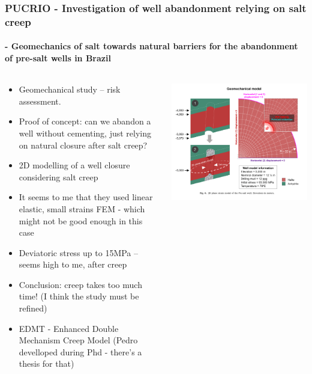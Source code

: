 \begin{frame}[shrink=20, fragile]
\frametitle{PUCRIO - Investigation of well abandonment relying on salt creep}
\framesubtitle{\cite{firme23} - Geomechanics of salt towards natural barriers for the abandonment of pre-salt wells in Brazil}

\begin{columns}
\begin{column}{0.5\textwidth}
	\begin{itemize}
		\item Geomechanical study -- risk assessment.
		\item Proof of concept: can we abandon a well without cementing, just relying on natural closure after salt creep?
		\item 2D modelling of a well closure considering salt creep
		\item It seems to me that they used linear elastic, small strains FEM - which might not be good enough in this case
		\item Deviatoric stress up to 15MPa -- seems high to me, after creep
		\item Conclusion: creep takes too much time! (I think the study must be refined)
		\item EDMT - Enhanced Double Mechanism Creep Model (Pedro develloped during Phd - there's a thesis for that)
	\end{itemize}
\end{column}
\begin{column}{0.5\textwidth}  %
    \begin{center}
     \includegraphics[width=\textwidth]{png/firme23}
     \end{center}
\end{column}
\end{columns}

\end{frame}
%
%

